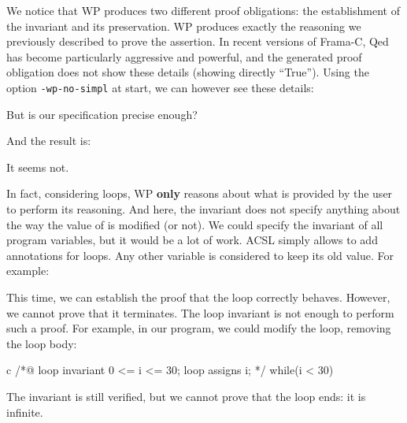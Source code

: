 

We notice that WP produces two different proof obligations: the
establishment of the invariant and its preservation. WP produces exactly
the reasoning we previously described to prove the assertion. In recent
versions of Frama-C, Qed has become particularly aggressive and
powerful, and the generated proof obligation does not show these details
(showing directly ``True''). Using the option \texttt{-wp-no-simpl} at
start, we can however see these details:





But is our specification precise enough?






And the result is:





It seems not.





In fact, considering loops, WP \textbf{only} reasons about what is
provided by the user to perform its reasoning. And here, the invariant
does not specify anything about the way the value of  is
modified (or not). We could specify the invariant of all program
variables, but it would be a lot of work. ACSL simply allows to add
 annotations for loops. Any other variable is considered
to keep its old value. For example:






This time, we can establish the proof that the loop correctly behaves.
However, we cannot prove that it terminates. The loop invariant is not
enough to perform such a proof. For example, in our program, we could
modify the loop, removing the loop body:



\begin{CodeBlock}{c}
/*@
  loop invariant 0 <= i <= 30;
  loop assigns i;
*/
while(i < 30){
   
}
\end{CodeBlock}



The invariant is still verified, but we cannot prove that the loop ends:
it is infinite.



